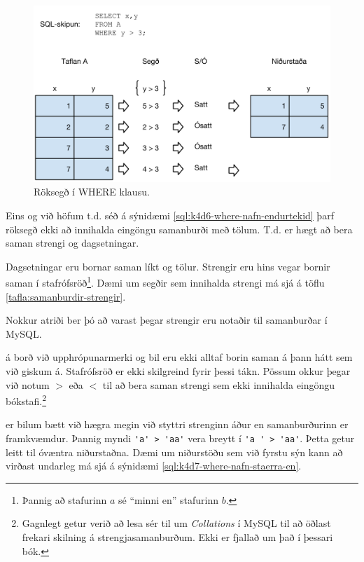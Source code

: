 \begin{figure}
\caption[Röksegð í WHERE klausu]{Röksegð í WHERE klausu.}
\label{mynd:roksegd}
\centering
\includegraphics[width=\linewidth]{myndir/roksegd}
\end{figure}

Eins og við höfum t.d. séð á sýnidæmi \ref{sql:k4d6-where-nafn-endurtekid} þarf röksegð ekki að innihalda eingöngu samanburði með tölum. T.d. er hægt að bera saman strengi og dagsetningar.

Dagsetningar eru bornar saman líkt og tölur. Strengir eru hins vegar bornir saman í stafrófsröð\footnote{Þannig að stafurinn $a$ sé ``minni en'' stafurinn $b$.}. Dæmi um segðir sem innihalda strengi má sjá á töflu \ref{tafla:samanburdir-strengir}.

Nokkur atriði ber þó að varast þegar strengir eru notaðir til samanburðar í MySQL.

á borð við upphrópunarmerki og bil eru ekki alltaf borin saman á þann hátt sem við giskum á. Stafrófsröð er ekki skilgreind fyrir þessi tákn. Pössum okkur þegar við notum $>$ eða $<$ til að bera saman strengi sem ekki innihalda eingöngu bókstafi.\footnote{Gagnlegt getur verið að lesa sér til um \emph{Collations} í MySQL til að öðlast frekari skilning á strengjasamanburðum. Ekki er fjallað um það í þessari bók.}

er bilum bætt við hægra megin við styttri strenginn áður en samanburðurinn er framkvæmdur. Þannig myndi \verb|'a' > 'aa'| vera breytt í \verb|'a ' > 'aa'|. Þetta getur leitt til óvæntra niðurstaðna. Dæmi um niðurstöðu sem við fyrstu sýn kann að virðast undarleg má sjá á sýnidæmi \ref{sql:k4d7-where-nafn-staerra-en}.

